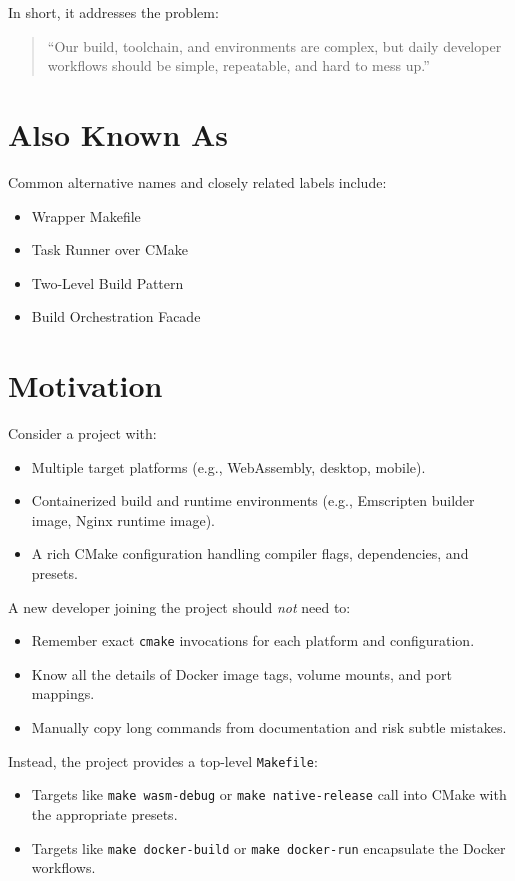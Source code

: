 \documentclass[11pt]{article}
\begin{document}
In short, it addresses the problem:
\begin{quote}
  ``Our build, toolchain, and environments are complex, but daily developer workflows should be simple, repeatable, and hard to mess up.''
\end{quote}

\section{Also Known As}

Common alternative names and closely related labels include:
\begin{itemize}[noitemsep]
  \item Wrapper Makefile
  \item Task Runner over CMake
  \item Two-Level Build Pattern
  \item Build Orchestration Facade
\end{itemize}

\section{Motivation}

Consider a project with:
\begin{itemize}[noitemsep]
  \item Multiple target platforms (e.g., WebAssembly, desktop, mobile).
  \item Containerized build and runtime environments (e.g., Emscripten builder image, Nginx runtime image).
  \item A rich CMake configuration handling compiler flags, dependencies, and presets.
\end{itemize}

A new developer joining the project should \emph{not} need to:
\begin{itemize}[noitemsep]
  \item Remember exact \texttt{cmake} invocations for each platform and configuration.
  \item Know all the details of Docker image tags, volume mounts, and port mappings.
  \item Manually copy long commands from documentation and risk subtle mistakes.
\end{itemize}

Instead, the project provides a top-level \texttt{Makefile}:
\begin{itemize}[noitemsep]
  \item Targets like \texttt{make wasm-debug} or \texttt{make native-release} call into CMake with the appropriate presets.
  \item Targets like \texttt{make docker-build} or \texttt{make docker-run} encapsulate the Docker workflows.
\end{itemize}
\end{document}
